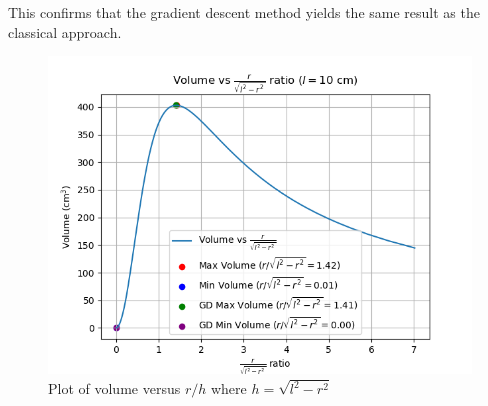 \documentclass[journal]{IEEEtran}
\begin{document}
This confirms that the gradient descent method yields the same result as the classical approach.



		\begin{figure}[h!]
		\centering
		\includegraphics[width=\columnwidth]{figs/fig1.png}
			\caption{Plot of volume versus $r/h$ where $h=\sqrt{l^2-r^2}$}
		\label{stemplot}
	\end{figure}
	
\end{document}
